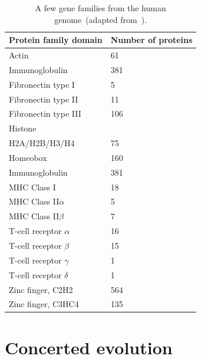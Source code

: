 \documentclass[12pt]{article}
\begin{document}
\begin{table}
\begin{center}
\begin{tabular}{ll}
\hline\hline
Protein family domain & Number of proteins \\
\hline
Actin                 & 61 \\
Immunoglobulin        & 381 \\
Fibronectin type I    & 5 \\
Fibronectin type II   & 11 \\
Fibronectin type III  & 106 \\
Histone \\
\quad H2A/H2B/H3/H4   & 75 \\
Homeobox              & 160 \\
Immunoglobulin        & 381 \\
MHC Class I           & 18 \\
MHC Class II$\alpha$  & 5 \\
MHC Class II$\beta$   & 7 \\
T-cell receptor $\alpha$ & 16 \\
T-cell receptor $\beta$  & 15 \\
T-cell receptor $\gamma$ & 1 \\
T-cell receptor $\delta$ & 1 \\
Zinc finger, C2H2     & 564 \\
Zinc finger, C3HC4    & 135 \\
\hline
\end{tabular}
\end{center}
\caption{A few gene families from the human genome~(adapted from~\cite{Ohta2003,Venter-etal2001}).}\label{table:superfamilies}
\end{table}

\section*{Concerted evolution}
\end{document}
